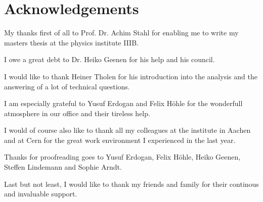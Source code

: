 \chapter*{Acknowledgements}


My thanks first of all to Prof. Dr. Achim Stahl for enabling me to write my masters thesis at the physics institute IIIB.

I owe a great debt to Dr. Heiko Geenen for his help and his council.

I would like to thank Heiner Tholen for his introduction into the \ttgamma analysis and the answering of a lot of technical questions.

I am especially grateful to Yusuf Erdogan and Felix H\"ohle for the wonderfull atmosphere in our office and their tireless help.

I would of course also like to thank all my colleagues at the institute in Aachen and at Cern for the great work environment I experienced in the last year.

Thanks for proofreading goes to Yusuf Erdogan, Felix H\"ohle, Heiko Geenen, Steffen Lindemann and Sophie Arndt.

Last but not least, I would like to thank my friends and family for their continous and invaluable support.

